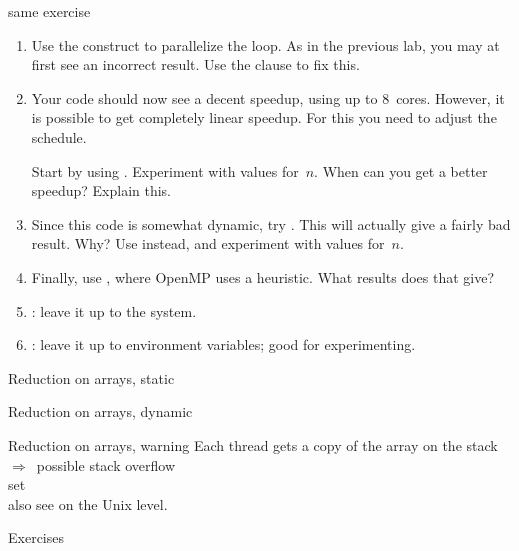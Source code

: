 \begin{numberedframe}{same exercise}
  \begin{enumerate}
  \item Use the  construct to parallelize the loop.
    As in the previous lab, you may at first see an incorrect result.
    Use the  clause to fix this.
  \item Your code should now see a decent speedup, using up to 8~cores.
    However, it is possible to get completely linear speedup. For this
    you need to adjust the schedule.

    Start by using . Experiment with values
    for~$n$.  When can you get a better speedup? Explain this.
  \item Since this code is somewhat dynamic, try .
    This will actually give a fairly bad result. Why?  Use
     instead, and experiment with values
    for~$n$.
  \item Finally, use , where OpenMP uses a
    heuristic.  What results does that give?
  \item {} : leave it up to the system.
  \item {} : leave it up to environment variables;
    good for experimenting.
  \end{enumerate}
\end{numberedframe}

\begin{numberedframe}{Reduction on arrays, static}
\end{numberedframe}

\begin{numberedframe}{Reduction on arrays, dynamic}
\end{numberedframe}

\begin{numberedframe}{Reduction on arrays, warning}
  Each thread gets a copy of the array on the stack\\
  $\Rightarrow$~possible stack overflow\\
  set \\
  also see  on the Unix level.
\end{numberedframe}

 {Exercises}

